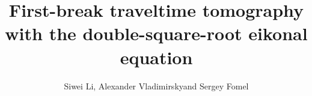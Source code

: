 
\title{First-break traveltime tomography with the double-square-root eikonal equation}

\renewcommand{\thefootnote}{\fnsymbol{footnote}}

\author{Siwei Li\footnotemark[1], Alexander Vladimirsky\footnotemark[2] and Sergey Fomel\footnotemark[1]}


\address{
\footnotemark[1]Bureau of Economic Geology \\
John A. and Katherine G. Jackson School of Geosciences \\
The University of Texas at Austin \\
University Station, Box X \\
Austin, TX 78713-8924 \\
\footnotemark[2]Department of Mathematics \\
Cornell University \\
430 Malott Hall \\
Ithaca, NY 14853-4201}


\maketitle

